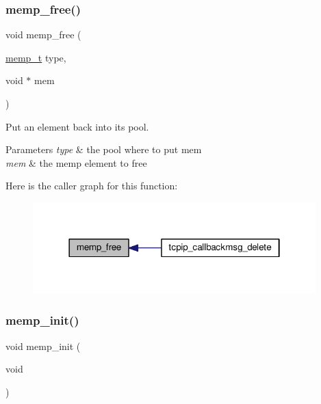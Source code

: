 \subsubsection{\texorpdfstring{memp\+\_\+free()}{memp\_free()}}
{\footnotesize\ttfamily void memp\+\_\+free (\begin{DoxyParamCaption}\item[{\hyperlink{native_2lwip_2src_2include_2lwip_2memp_8h_a85a164b1f7764951cc685ea525114e57}{memp\+\_\+t}}]{type,  }\item[{void $\ast$}]{mem }\end{DoxyParamCaption})}

Put an element back into its pool.


\begin{DoxyParams}{Parameters}
{\em type} & the pool where to put mem \\
\hline
{\em mem} & the memp element to free \\
\hline
\end{DoxyParams}
Here is the caller graph for this function\+:
\nopagebreak
\begin{figure}[H]
\begin{center}
\leavevmode
\includegraphics[width=310pt]{openmote-cc2538_2lwip_2src_2include_2lwip_2memp_8h_aecd94926b7c2a0e23ae195f4ae97581f_icgraph}
\end{center}
\end{figure}
\mbox{\label{openmote-cc2538_2lwip_2src_2include_2lwip_2memp_8h_a9693e5b1ac2c6b9c0e7870522d45efa2}} 
\subsubsection{\texorpdfstring{memp\+\_\+init()}{memp\_init()}}
{\footnotesize\ttfamily void memp\+\_\+init (\begin{DoxyParamCaption}\item[{void}]{ }\end{DoxyParamCaption})}

